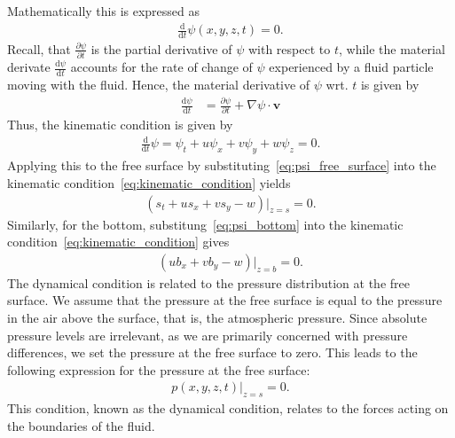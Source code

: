 Mathematically this is expressed as
\begin{align*}
    \frac{\text{d} }{\text{d} t} \psi(x,y,z,t) = 0.
\end{align*}
Recall, that $\frac{\partial \psi}{\partial t}$ is the partial derivative of $\psi$ with respect to $t$, while the material derivate $\frac{\text{d} \psi}{\text{d} t}$ accounts for the rate of change of $\psi$ experienced by a fluid particle moving with the fluid.
Hence, the material derivative of $\psi$ wrt. $t$ is given by
\begin{align*}
    \frac{\text{d} \psi}{\text{d} t} &= \frac{\partial \psi}{\partial t}  + \nabla \psi \cdot \mathbf{v}
\end{align*}
Thus, the kinematic condition is given by
\begin{align}\label{eq:kinematic_condition}
    \frac{\text{d} }{\text{d} t} \psi = \psi_t + u \psi_x + v \psi_y + w \psi_z = 0.
\end{align}
Applying this to the free surface by substituting~\eqref{eq:psi_free_surface} into the kinematic condition~\eqref{eq:kinematic_condition} yields
\begin{align}\label{eq:kinematic_condition_free_surface}
    (s_t + u s_x + v s_y - w)|_{z=s} = 0.
\end{align}
Similarly, for the bottom, substitung~\eqref{eq:psi_bottom} into the kinematic condition~\eqref{eq:kinematic_condition} gives
\begin{align}\label{eq:kinematic_condition_bottom}
    (u b_x + v b_y - w)|_{z=b} = 0.
\end{align}
The dynamical condition is related to the pressure distribution at the free surface.
We assume that the pressure at the free surface is equal to the pressure in the air above the surface, that is, the atmospheric pressure.
Since absolute pressure levels are irrelevant, as we are primarily concerned with pressure differences, we set the pressure at the free surface to zero.
This leads to the following expression for the pressure at the free surface:
\begin{align}\label{eq:pressure_free_surface}
    p(x,y,z,t)|_{z = s} = 0.
\end{align}
This condition, known as the dynamical condition, relates to the forces acting on the boundaries of the fluid.

